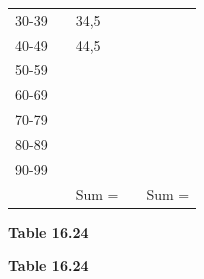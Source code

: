 \begin{description}[noitemsep]
\begin{description}[noitemsep]
\begin{enumerate}[noitemsep, label=\textbf{\arabic*}. ]
\begin{table}[H]
\begin{center}
\begin{xtabular}[t]{|l|l|l|l|l|}
     \tabularnewline{}
        30-39 &
         &
        34,5 &
         &
     \tabularnewline{}
        40-49 &
         &
        44,5 &
         &
     \tabularnewline{}
        50-59 &
         &
         &
         &
     \tabularnewline{}
        60-69 &
         &
         &
         &
     \tabularnewline{}
        70-79 &
         &
         &
         &
     \tabularnewline{}
        80-89 &
         &
         &
         &
     \tabularnewline{}
        90-99 &
         &
         &
         &
     \tabularnewline{}
         &
         &
        Sum = &
         &
        Sum =%
     \tabularnewline{}
    \end{xtabular}
      \end{center}
    \begin{center}{\small\bfseries Table 16.24}\end{center}
    \begin{caption}{\small\bfseries Table 16.24}\end{caption}
\end{table}
    \par
  \par         \end{enumerate}

\end{description}
\end{description}
